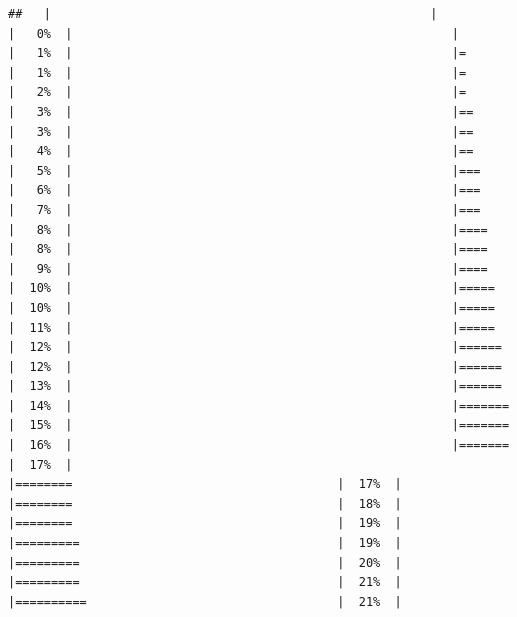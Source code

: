 \documentclass[
  krantz2]{krantz}
\begin{document}
\begin{verbatim}
##   |                                                     |                                             |   0%  |                                                     |                                             |   1%  |                                                     |=                                            |   1%  |                                                     |=                                            |   2%  |                                                     |=                                            |   3%  |                                                     |==                                           |   3%  |                                                     |==                                           |   4%  |                                                     |==                                           |   5%  |                                                     |===                                          |   6%  |                                                     |===                                          |   7%  |                                                     |===                                          |   8%  |                                                     |====                                         |   8%  |                                                     |====                                         |   9%  |                                                     |====                                         |  10%  |                                                     |=====                                        |  10%  |                                                     |=====                                        |  11%  |                                                     |=====                                        |  12%  |                                                     |======                                       |  12%  |                                                     |======                                       |  13%  |                                                     |======                                       |  14%  |                                                     |=======                                      |  15%  |                                                     |=======                                      |  16%  |                                                     |=======                                      |  17%  |                                                     |========                                     |  17%  |                                                     |========                                     |  18%  |                                                     |========                                     |  19%  |                                                     |=========                                    |  19%  |                                                     |=========                                    |  20%  |                                                     |=========                                    |  21%  |                                                     |==========                                   |  21%  |         
\end{verbatim}
\end{document}
